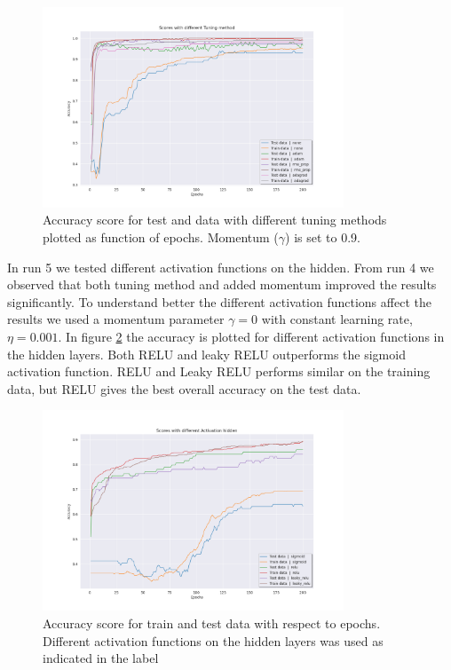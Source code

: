 \begin{figure}[H]
    \centering
    \includegraphics[width=0.8\textwidth]{Figures/PartD/d_tuning_eta_0_001_with_gamma_0_9.png}
    \caption{Accuracy score for test and data with different tuning methods
    plotted as function of epochs. Momentum ($\gamma $) is set to 0.9.}  
    \label{fig:d_tuning_eta_0_001_with_gamma_0_9} 

\end{figure}


In run 5 we tested different activation functions on the hidden. From run 4 we
observed that both tuning method and added momentum improved the results
significantly. To understand better the different activation functions affect
the results we used a momentum parameter $\gamma = 0$ with constant learning
rate, $\eta = 0.001$. In figure \ref{fig:d_line_activation_hidden_gamma_0} the
accuracy is plotted for different activation functions in the hidden layers.
Both RELU and leaky RELU outperforms the sigmoid activation function. RELU and
Leaky RELU performs similar on the training data, but RELU gives the best
overall accuracy on the test data. 


\begin{figure}[H]
    \centering
    \includegraphics[width=0.8\textwidth]{Figures/PartD/d_line_activation_hidden_gamma_0.png}
    \caption{Accuracy score for train and test data with respect to epochs.
    Different activation functions on the hidden layers was used as indicated
in the label}  
\label{fig:d_line_activation_hidden_gamma_0} 
\end{figure}


